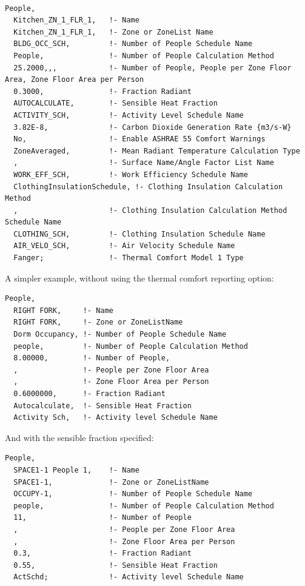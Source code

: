 \begin{lstlisting}

People,
  Kitchen_ZN_1_FLR_1,   !- Name
  Kitchen_ZN_1_FLR_1,   !- Zone or ZoneList Name
  BLDG_OCC_SCH,         !- Number of People Schedule Name
  People,               !- Number of People Calculation Method
  25.2000,,,            !- Number of People, People per Zone Floor Area, Zone Floor Area per Person
  0.3000,               !- Fraction Radiant
  AUTOCALCULATE,        !- Sensible Heat Fraction
  ACTIVITY_SCH,         !- Activity Level Schedule Name
  3.82E-8,              !- Carbon Dioxide Generation Rate {m3/s-W}
  No,                   !- Enable ASHRAE 55 Comfort Warnings
  ZoneAveraged,         !- Mean Radiant Temperature Calculation Type
  ,                     !- Surface Name/Angle Factor List Name
  WORK_EFF_SCH,         !- Work Efficiency Schedule Name
  ClothingInsulationSchedule, !- Clothing Insulation Calculation Method
  ,                     !- Clothing Insulation Calculation Method Schedule Name
  CLOTHING_SCH,         !- Clothing Insulation Schedule Name
  AIR_VELO_SCH,         !- Air Velocity Schedule Name
  Fanger;               !- Thermal Comfort Model 1 Type
\end{lstlisting}

A simpler example, without using the thermal comfort reporting option:

\begin{lstlisting}
People,
  RIGHT FORK,     !- Name
  RIGHT FORK,     !- Zone or ZoneListName
  Dorm Occupancy, !- Number of People Schedule Name
  people,         !- Number of People Calculation Method
  8.00000,        !- Number of People,
  ,               !- People per Zone Floor Area
  ,               !- Zone Floor Area per Person
  0.6000000,      !- Fraction Radiant
  Autocalculate,  !- Sensible Heat Fraction
  Activity Sch,   !- Activity level Schedule Name
\end{lstlisting}

And with the sensible fraction specified:

\begin{lstlisting}
People,
  SPACE1-1 People 1,    !- Name
  SPACE1-1,             !- Zone or ZoneListName
  OCCUPY-1,             !- Number of People Schedule Name
  people,               !- Number of People Calculation Method
  11,                   !- Number of People
  ,                     !- People per Zone Floor Area
  ,                     !- Zone Floor Area per Person
  0.3,                  !- Fraction Radiant
  0.55,                 !- Sensible Heat Fraction
  ActSchd;              !- Activity level Schedule Name
\end{lstlisting}

